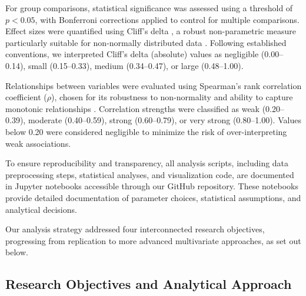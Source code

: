 \documentclass[diagnostics,article,accept,pdftex,moreauthors]{Definitions/mdpi}
\begin{document}
For group comparisons, statistical significance was assessed using a threshold of $p < 0.05$, with Bonferroni corrections applied to control for multiple comparisons. Effect sizes were quantified using Cliff's delta \cite{cliff1993dominance}, a robust non-parametric measure particularly suitable for non-normally distributed data \cite{meissel2024using}. Following established conventions, we interpreted Cliff's delta (absolute) values as negligible (0.00--0.14), small (0.15--0.33), medium (0.34--0.47), or large (0.48--1.00). 

Relationships between variables were evaluated using Spearman's rank correlation coefficient ($\rho$), chosen for its robustness to non-normality and ability to capture monotonic relationships \cite{spearman1961proof}. Correlation strengths were classified as weak (0.20--0.39), moderate (0.40--0.59), strong (0.60--0.79), or very strong (0.80--1.00). Values below 0.20 were considered negligible to minimize the risk of over-interpreting weak associations.

To ensure reproducibility and transparency, all analysis scripts, including data preprocessing steps, statistical analyses, and visualization code, are documented in Jupyter notebooks accessible through our GitHub repository. These notebooks provide detailed documentation of parameter choices, statistical assumptions, and analytical decisions. 



Our analysis strategy addressed four interconnected research objectives, progressing from replication to more advanced multivariate approaches, as set out below.

\subsection{Research Objectives and Analytical Approach}
\end{document}
